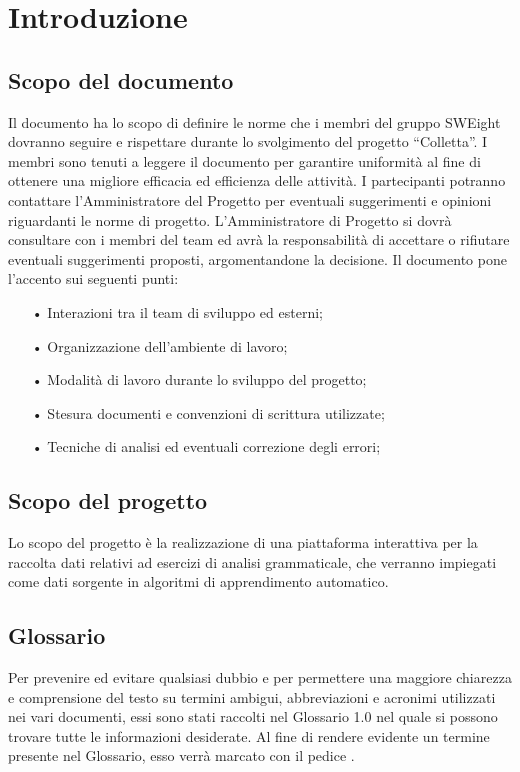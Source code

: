 \section{Introduzione}
\subsection{Scopo del documento}
Il documento ha lo scopo di definire le norme che i membri del gruppo SWEight dovranno seguire e rispettare durante lo svolgimento del progetto “Colletta”. 
I membri sono tenuti a leggere il documento per garantire uniformità al fine di ottenere una migliore efficacia ed efficienza delle attività. I partecipanti potranno contattare l'Amministratore del Progetto per eventuali suggerimenti e opinioni riguardanti le norme di progetto. 
L'Amministratore di Progetto si dovrà consultare con i membri del team ed avrà la responsabilità di accettare o rifiutare eventuali suggerimenti proposti, argomentandone la decisione.
Il documento pone l'accento sui seguenti punti:
\begin{itemize}
\item[•] Interazioni tra il team di sviluppo ed esterni;
\item[•] Organizzazione dell'ambiente di lavoro;
\item[•] Modalità di lavoro durante lo sviluppo del progetto;
\item[•] Stesura documenti e convenzioni di scrittura utilizzate;
\item[•] Tecniche di analisi ed eventuali correzione degli errori;	
\end{itemize}
\subsection{Scopo del progetto}
Lo scopo del progetto è la realizzazione di una piattaforma interattiva per la raccolta dati relativi ad esercizi di analisi grammaticale, che verranno impiegati come dati sorgente in algoritmi di apprendimento automatico. %
\subsection{Glossario}
Per prevenire ed evitare qualsiasi dubbio e per permettere una maggiore chiarezza e comprensione del testo su termini ambigui, abbreviazioni e acronimi utilizzati nei vari documenti, essi sono stati raccolti nel Glossario 1.0 nel quale si possono trovare tutte le informazioni desiderate. Al fine di rendere evidente un termine presente nel Glossario, esso verrà marcato con il pedice .
